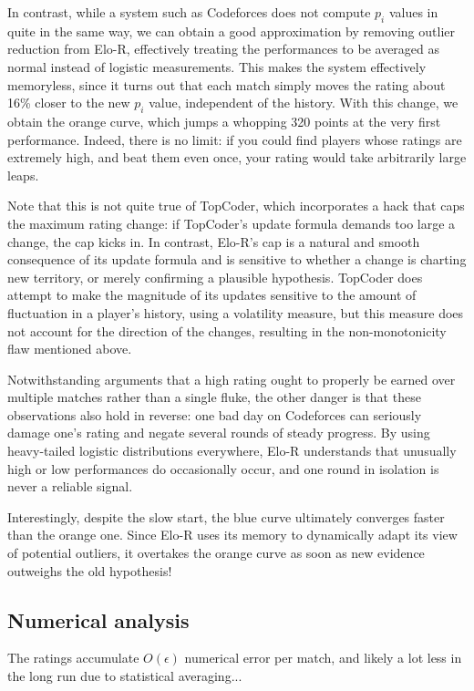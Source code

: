 In contrast, while a system such as Codeforces does not compute $p_i$ values in quite in the same way, we can obtain a good approximation by removing outlier reduction from Elo-R, effectively treating the performances to be averaged as normal instead of logistic measurements. This makes the system effectively memoryless, since it turns out that each match simply moves the rating about 16\% closer to the new $p_i$ value, independent of the history. With this change, we obtain the orange curve, which jumps a whopping 320 points at the very first performance. Indeed, there is no limit: if you could find players whose ratings are extremely high, and beat them even once, your rating would take arbitrarily large leaps.

Note that this is not quite true of TopCoder, which incorporates a hack that caps the maximum rating change: if TopCoder's update formula demands too large a change, the cap kicks in. In contrast, Elo-R's cap is a natural and smooth consequence of its update formula and is sensitive to whether a change is charting new territory, or merely confirming a plausible hypothesis. TopCoder does attempt to make the magnitude of its updates sensitive to the amount of fluctuation in a player's history, using a volatility measure, but this measure does not account for the direction of the changes, resulting in the non-monotonicity flaw mentioned above.

Notwithstanding arguments that a high rating ought to properly be earned over multiple matches rather than a single fluke, the other danger is that these observations also hold in reverse: one bad day on Codeforces can seriously damage one's rating and negate several rounds of steady progress. By using heavy-tailed logistic distributions everywhere, Elo-R understands that unusually high or low performances do occasionally occur, and one round in isolation is never a reliable signal.

Interestingly, despite the slow start, the blue curve ultimately converges faster than the orange one. Since Elo-R uses its memory to dynamically adapt its view of potential outliers, it overtakes the orange curve as soon as new evidence outweighs the old hypothesis!

\subsection{Numerical analysis}

The ratings accumulate $O(\epsilon)$ numerical error per match, and likely a lot less in the long run due to statistical averaging...